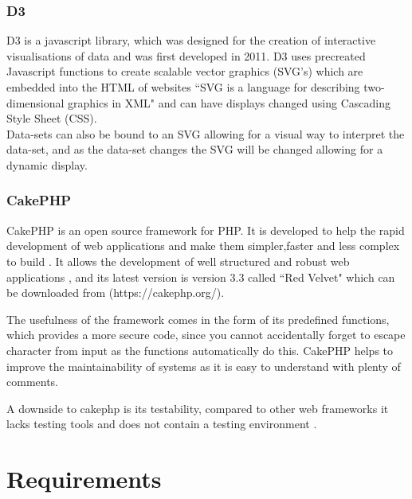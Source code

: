 \documentclass[11pt]{report}
\begin{document}
\subsection{D3}
D3 \cite{bostock_d3.js_????-1} is a javascript library, which was designed for the creation of interactive visualisations of data and was first developed in 2011. D3 uses precreated Javascript functions to create scalable vector graphics (SVG's) which are embedded into the HTML of websites ``SVG is a language for describing two-dimensional graphics in XML"\cite{ferraiolo_scalable_2000-1} and can have displays changed using Cascading Style Sheet (CSS).  \\
Data-sets can also be bound to an SVG allowing for a visual way to interpret the data-set, and as the data-set changes the SVG will be changed allowing for a dynamic display.



\subsection{CakePHP}
CakePHP is an open source framework for PHP. It is developed to help the rapid development of web applications and make them simpler,faster and less complex to build \cite{_cakephp_????-1}. It allows the development of well structured and robust web applications \cite{plekhanova_evaluating_2009-1}, and its latest version is version 3.3 called ``Red Velvet" which can be downloaded from (https://cakephp.org/).

The usefulness of the framework comes in the form of its predefined functions, which provides a more secure code, since you cannot accidentally forget to escape character from input as the functions automatically do this. CakePHP helps to improve the maintainability of systems as it is easy to understand with plenty of comments.

A downside to cakephp is its testability, compared to other web frameworks it lacks testing tools and does not contain a testing environment \cite{plekhanova_evaluating_2009-1}.





\newpage
\chapter{Requirements}\label{section:require}
 
\end{document}

